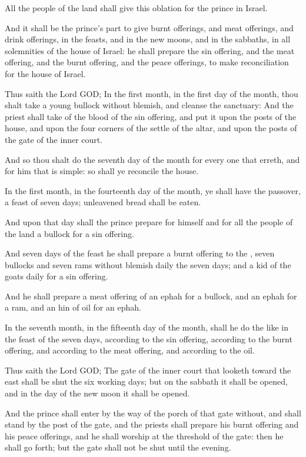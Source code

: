 \Verse All the people of the land shall give this oblation for the prince in Israel.

\Verse And it shall be the prince's part to give burnt offerings, and meat offerings, and drink offerings, in the feasts, and in the new moons, and in the sabbaths, in all solemnities of the house of Israel: he shall prepare the sin offering, and the meat offering, and the burnt offering, and the peace offerings, to make reconciliation for the house of Israel.

\Verse Thus saith the Lord GOD; In the first month, in the first day of the month, thou shalt take a young bullock without blemish, and cleanse the sanctuary: \Verse And the priest shall take of the blood of the sin offering, and put it upon the posts of the house, and upon the four corners of the settle of the altar, and upon the posts of the gate of the inner court.

\Verse And so thou shalt do the seventh day of the month for every one that erreth, and for him that is simple: so shall ye reconcile the house.

\Verse In the first month, in the fourteenth day of the month, ye shall have the passover, a feast of seven days; unleavened bread shall be eaten.

\Verse And upon that day shall the prince prepare for himself and for all the people of the land a bullock for a sin offering.

\Verse And seven days of the feast he shall prepare a burnt offering to the \LORD, seven bullocks and seven rams without blemish daily the seven days; and a kid of the goats daily for a sin offering.

\Verse And he shall prepare a meat offering of an ephah for a bullock, and an ephah for a ram, and an hin of oil for an ephah.

\Verse In the seventh month, in the fifteenth day of the month, shall he do the like in the feast of the seven days, according to the sin offering, according to the burnt offering, and according to the meat offering, and according to the oil.


\Chapter
\Verse Thus saith the Lord GOD; The gate of the inner court that looketh toward the east shall be shut the six working days; but on the sabbath it shall be opened, and in the day of the new moon it shall be opened.

\Verse And the prince shall enter by the way of the porch of that gate without, and shall stand by the post of the gate, and the priests shall prepare his burnt offering and his peace offerings, and he shall worship at the threshold of the gate: then he shall go forth; but the gate shall not be shut until the evening.

